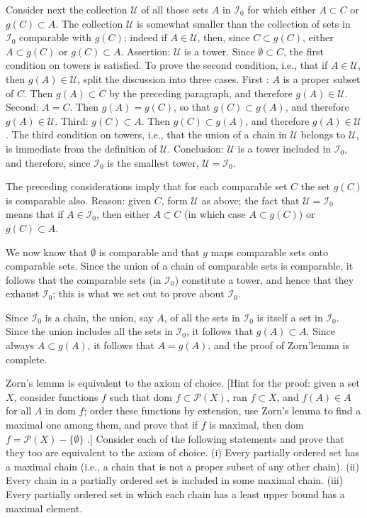 Consider next the collection $\mathcal{U}$ of all those sets $A$ in $\mathcal{I}_{0}$ for which either $A \subset C$ or $g(C) \subset A$. The collection $\mathcal{U}$ is somewhat smaller than the collection of sets in $\mathcal{I}_{0}$ comparable with $g(C)$; indeed if $A \in \mathcal{U}$, then, since $C \subset g(C)$, either $A \subset g(C)$ or $g(C) \subset A$. Assertion: $\mathcal{U}$ is a tower. Since $\emptyset \subset C$, the first condition on towers is satisfied. To prove the second condition, i.e., that if $A \in \mathcal{U}$, then $g(A) \in \mathcal {U}$, split the discussion into three cases. First : $A$ is a proper subset of $C$. Then $g(A) \subset C$ by the preceding paragraph, and therefore $g(A) \in \mathcal{U}$. Second: $A = C$. Then $g(A) = g(C)$, so that $g(C) \subset g(A)$, and therefore $g(A) \in \mathcal{U}$. Third: $g(C) \subset A$. Then $g(C) \subset g(A)$, and therefore $g(A) \in \mathcal{U}$. The third condition on towers, i.e., that the union of a chain in $\mathcal{U}$ belongs to $\mathcal{U}$, is immediate from the definition of $\mathcal{U}$. Conclusion: $\mathcal{U}$ is a tower included in $\mathcal{I}_{0}$, and therefore, since $\mathcal{I}_{0}$ is the smallest tower, $\mathcal{U} = \mathcal{I}_{0}$. 

The preceding considerations imply that for each comparable set $C$ the set $g(C)$ is comparable also. Reason: given $C$, form $\mathcal{U}$ as above; the fact that $\mathcal{U} = \mathcal{I}_{0}$ means that if $A \in \mathcal{I}_{0}$, then either $A \subset C$ (in which case $A \subset g(C)$) or $g(C) \subset A$.

We now know that $\emptyset$ is comparable and that $g$ maps comparable sets onto comparable sets. Since the union of a chain of comparable sets is comparable, it follows that the comparable sets (in $\mathcal{I}_{0}$) constitute a tower, and hence that they exhaust $\mathcal{I}_{0}$; this is what we set out to prove about $\mathcal{I}_{0}$. 

Since $\mathcal{I}_{0}$ is a chain, the union, say $A$, of all the sets in $\mathcal{I}_{0}$ is itself a set in $\mathcal{I}_{0}$. Since the union includes all the sets in $\mathcal{I}_{0}$, it follows that $g(A) \subset A$. Since always $A \subset g(A)$, it follows that $A = g(A)$, and the proof of Zorn'lemma is complete.

\begin{exercise} Zorn's lemma is equivalent to the axiom of choice. [Hint for the proof: given a set $X$, consider functions $f$ such that dom $f \subset \mathcal{P}(X)$, ran $f \subset X$, and $f(A) \in A$ for all $A$ in dom $f$; order these functions by extension, use Zorn's lemma to find a maximal one among them, and prove that if $f$ is maximal, then dom $f = \mathcal{P}(X) - \{ \emptyset \}$ .] Consider each of the following statements and prove that they too are equivalent to the axiom of choice. (i) Every partially ordered set has a maximal chain (i.e., a chain that is not a proper subset of any other chain). (ii) Every chain in a partially ordered set is included in some maximal chain. (iii) Every partially ordered set in which each chain has a least upper bound has a maximal element.
\end{exercise}